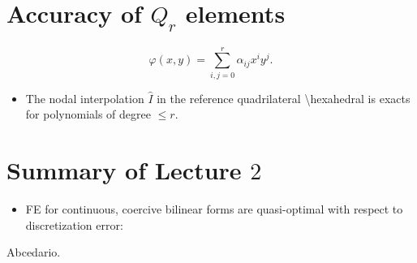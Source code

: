 \documentclass[
	a4paper,
	11pt,
	oneside
]{scrreprt}
\theoremstyle{definition}
\begin{document}
\section{Accuracy of $Q_{r}$ elements}

\[ \varphi\left(x,y\right)=\sum_{i,j=0}^{r}\alpha_{ij}x^{i}y^{j}. \]

\begin{itemize}
	\item The nodal interpolation $\hat{I}$ in the reference quadrilateral \textbackslash hexahedral is exacts for polynomials of degree $\le r$.
\end{itemize}

\section{Summary of Lecture $2$}

\begin{itemize}
	\item FE for continuous, coercive bilinear forms are quasi-optimal with respect to discretization error:
\end{itemize}

Abcedario.
\end{document}
